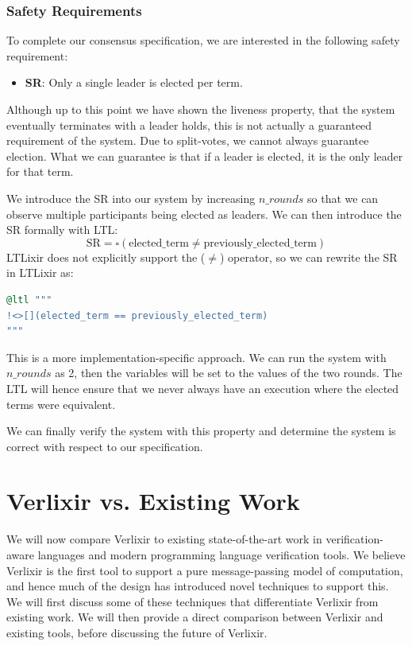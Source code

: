 \subsubsection{Safety Requirements}
To complete our consensus specification, we are interested in the following safety requirement:
\begin{itemize}
    \item \textbf{SR}: Only a single leader is elected per term.
\end{itemize}
Although up to this point we have shown the liveness property, that the system eventually terminates with a leader holds, this is not actually a guaranteed requirement of the system. Due to split-votes, we cannot always guarantee election. What we can guarantee is that if a leader is elected, it is the only leader for that term.
\par
We introduce the SR into our system by increasing $n\_rounds$ so that we can observe multiple participants being elected as leaders. We can then introduce the SR formally with LTL:
\[
\text{SR} = \square ( \text{elected\_term} \neq \text{previously\_elected\_term} )
\]
LTLixir does not explicitly support the ($\neq$) operator, so we can rewrite the SR in LTLixir as:
\begin{lstlisting}[language=Elixir, xleftmargin=.3\linewidth]
@ltl """
!<>[](elected_term == previously_elected_term)
"""
\end{lstlisting}
This is a more implementation-specific approach. We can run the system with $n\_rounds$ as 2, then the variables will be set to the values of the two rounds. The LTL will hence ensure that we never always have an execution where the elected terms were equivalent.
\par
We can finally verify the system with this property and determine the system is correct with respect to our specification.
\section{Verlixir vs. Existing Work} \label{sec:vs}
We will now compare Verlixir to existing state-of-the-art work in verification-aware languages and modern programming language verification tools. We believe Verlixir is the first tool to support a pure message-passing model of computation, and hence much of the design has introduced novel techniques to support this. We will first discuss some of these techniques that differentiate Verlixir from existing work. We will then provide a direct comparison between Verlixir and existing tools, before discussing the future of Verlixir.
